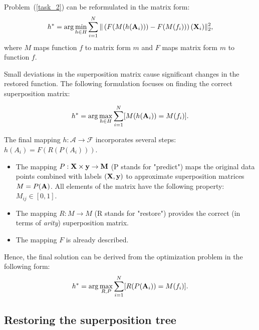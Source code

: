 \documentclass[11pt, tightenlines, twoside, onecolumn, nofloats, nobibnotes, nofootinbib, superscriptaddress, noshowpacks, centertags]{revtex4}
\begin{document}
Problem~(\ref{task_2}) can be reformulated in the matrix form:
\begin{align*}
h^{\ast}=\arg\min\limits_{h\in H}\sum_{i=1}^{N}\|\left(F(M(h(\bold A_i)))-F(M(f_i))\right)(\bold X_i)\|_2^2,
\end{align*}
where $M$ maps function $f$ to matrix form $m$ and $F$ maps matrix form $m$ to function $f$.

Small deviations in the superposition matrix cause significant changes in the restored function. The following formulation focuses on finding the correct superposition matrix:

\begin{align*}
h^{\ast}=\arg\max\limits_{h\in H}\sum_{i=1}^{N}\ls M(h(\bold A_i))=M(f_i)\rs.
\end{align*}

The final mapping $h:\mathcal{A}\to\mathcal{F}$ incorporates several steps: $h(A_i) = F(R(P(A_i)))$. 
\begin{itemize}
    \item The mapping $P:\bold X\times \bold y\to \bold M$ (P stands for "predict") maps the original data points combined with labels $(\bold X, \bold y)$ to approximate superposition matrices $M=P(\bold A)$. All elements of the matrix have the following property: $M_{ij}\in[0, 1]$.
    \item The mapping $R: M\to M$ (R stands for "restore") provides the correct (in terms of \emph{arity}) superposition matrix.
    \item The mapping $F$ is already described.
\end{itemize}

Hence, the final solution can be derived from the optimization problem in the following form:
\begin{align}
h^{\ast}=\arg\max\limits_{R, P}\sum_{i=1}^{N}\ls R(P(\bold A_i))=M(f_i)\rs.
\label{task_final}
\end{align}

\subsection{Restoring the superposition tree}
\end{document}
